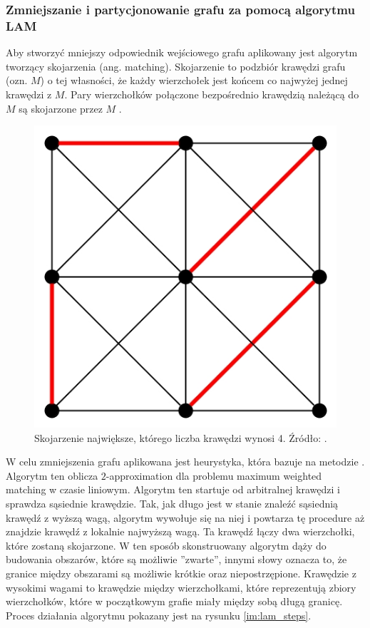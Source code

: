 \subsubsection{Zmniejszanie i partycjonowanie grafu za pomocą algorytmu LAM}

Aby stworzyć mniejszy odpowiednik wejściowego grafu aplikowany jest algorytm tworzący skojarzenia (ang. matching).
Skojarzenie to podzbiór krawędzi grafu (ozn. $M$) o tej własności, że każdy wierzchołek jest końcem co najwyżej jednej krawędzi z $M$.
Pary wierzchołków połączone bezpośrednio krawędzią należącą do $M$ są skojarzone przez $M$ \cite{wiki:skojarzenie}.
\begin{figure}[h]
    \centering
    \includegraphics[width=0.24\linewidth]{images/Maximum_matching}
    \caption{Skojarzenie największe, którego liczba krawędzi wynosi 4.
    Źródło: \cite{wiki:skojarzenie}.}
    \label{im:max_skojarzenie}
\end{figure}

W celu zmniejszenia grafu aplikowana jest heurystyka, która bazuje na metodzie \cite{weighted_maching}.
Algorytm ten oblicza $2$-approximation dla problemu maximum weighted matching w czasie liniowym.
Algorytm ten startuje od arbitralnej krawędzi i sprawdza sąsiednie krawędzie.
Tak, jak długo jest w stanie znaleźć sąsiednią
krawędź z wyższą wagą, algorytm wywołuje się na niej i powtarza tę procedure aż znajdzie krawędź z lokalnie najwyższą
wagą.
Ta krawędź łączy dwa wierzchołki, które zostaną skojarzone.
W ten sposób skonstruowany algorytm dąży do budowania obszarów, które są możliwie ''zwarte'',
innymi słowy oznacza to, że granice między obszarami są możliwie krótkie oraz niepostrzępione.
Krawędzie z wysokimi wagami to krawędzie między wierzchołkami,
które reprezentują zbiory wierzchołków, które w początkowym grafie miały między sobą długą granicę.
Proces działania algorytmu pokazany jest na rysunku \ref{im:lam_steps}.

